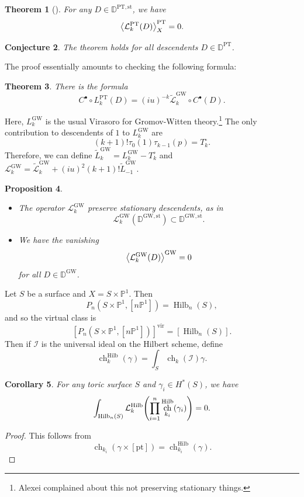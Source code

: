 \documentclass[leqno, openany]{memoir}
\newtheorem{thm}{Theorem}[section]
\newtheorem{cor}[thm]{Corollary}
\newtheorem{prop}[thm]{Proposition}
\newtheorem{conj}[thm]{Conjecture}
\theoremstyle{definition}
\theoremstyle{remark}
\theoremstyle{plain}
\theoremstyle{definition}
\theoremstyle{remark}
\renewcommand{\P}{\mathbb{P}}
\newcommand{\mc}[1]{\mathcal{#1}}
\newcommand{\mr}[1]{\mathrm{#1}}
\newcommand{\wt}[1]{\widetilde{#1}}
\DeclareMathOperator{\ch}{ch}
\DeclareMathOperator{\Hilb}{Hilb}
\begin{document}
\begin{thm}[\cite{virasoropt}]
    For any $D \in \mathbb{D}^{\mr{PT},\mr{st}}$, we have
    \[ \ev{\mc{L}_k^{\mr{PT}}(D)}_X^{\mr{PT}} = 0. \]
\end{thm}

\begin{conj}
    The theorem holds for all descendents $D \in \mathbb{D}^{\mr{PT}}$.
\end{conj}

The proof essentially amounts to checking the following formula:
\begin{thm}
    There is the formula
    \[ C^{\bullet} \circ L_k^{\mr{PT}}(D) = (iu)^{-k} \wt{\mc{L}}_k^{\mr{GW}} \circ C^{\bullet}(D). \]
\end{thm}
Here, $L_k^{\mr{GW}}$ is the usual Virasoro for Gromov-Witten theory.\footnote{Alexei complained about this not preserving stationary things.} The only contribution to descendents of $1$ to $L_k^{\mr{GW}}$ are
\[ (k+1)! \tau_0(1) \tau_{k-1}(p) = T_k^{\circ}. \]
Therefore, we can define $\wt{L}_k^{\mr{GW}} = L_k^{\mr{GW}} - T_k^{\circ}$ and $\mc{L}_k^{\mr{GW}} = \wt{\mc{L}}_k^{\mr{GW}} + (iu)^2 (k+1)! \wt{L}_{-1}^{\mr{GW}}$.
\begin{prop}\leavevmode
    \begin{itemize}
        \item The operator $\mc{L}_k^{\mr{GW}}$ preserve stationary descendents, as in
            \[ \mc{L}_k^{\mr{GW}}(\mathbb{D}^{\mr{GW}, \mr{st}}) \subset \mathbb{D}^{\mr{GW}, \mr{st}}. \]
        \item We have the vanishing
            \[ \ev{\mc{L}_k^{\mr{GW}}(D)}^{\mr{GW}} = 0 \]
            for all $D \in \mathbb{D}^{\mr{GW}}$.
    \end{itemize}
\end{prop}

Let $S$ be a surface and $X = S \times \P^1$. Then
\[ P_n(S \times \P^1, [n \P^1]) = \Hilb_n(S), \]
and so the virtual class is
\[ [P_n(S \times \P^1, [n \P^1])]^{\mr{vir}} = [\Hilb_n(S)]. \]
Then if $\mc{I}$ is the universal ideal on the Hilbert scheme, define
\[ \ch_k^{\Hilb}(\gamma) = \int_S \ch_k(\mc{I}) \gamma. \]
\begin{cor}
    For any toric surface $S$ and $\gamma_i \in H^*(S)$, we have
    \[ \int_{\Hilb_n(S)} \mc{L}_k^{\Hilb} \qty(\prod_{i=1}^n \ch_{k_i}^{\Hilb}(\gamma_i)) = 0. \]
\end{cor}

\begin{proof}
    This follows from
    \[ \ch_{k_i}(\gamma \times [\mr{pt}]) = \ch_{k_i}^{\Hilb}(\gamma). \]
\end{proof}
\end{document}
